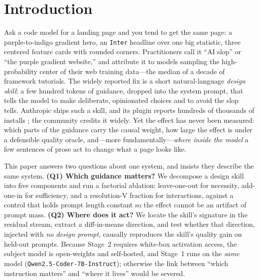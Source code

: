 \section{Introduction}
\label{sec:intro}

Ask a code model for a landing page and you tend to get the same page: a purple-to-indigo
gradient hero, an \texttt{Inter} headline over one big statistic, three centered feature
cards with rounded corners. Practitioners call it ``AI slop'' or ``the purple gradient
website,'' and attribute it to models sampling the high-probability center of their web
training data---the median of a decade of framework tutorials. The widely reported fix is a
short natural-language \emph{design skill}: a few hundred tokens of guidance, dropped into the
system prompt, that tells the model to make deliberate, opinionated choices and to avoid the
slop tells. Anthropic ships such a skill, and its plugin reports hundreds of thousands of
installs \citep{anthropic2025frontendskill,anthropic2025frontendblog}; the community credits
it widely. Yet the effect has never been measured: which parts of the guidance carry the
causal weight, how large the effect is under a defensible quality oracle, and---more
fundamentally---\emph{where inside the model} a few sentences of prose act to change what a
page looks like.

This paper answers two questions about one system, and insists they describe the same system.
\textbf{(Q1) Which guidance matters?} We decompose a design skill into five components and run
a factorial ablation: leave-one-out for necessity, add-one-in for sufficiency, and a
resolution-V fraction for interactions, against a control that holds prompt length constant so
the effect cannot be an artifact of prompt mass. \textbf{(Q2) Where does it act?} We locate the
skill's signature in the residual stream, extract a diff-in-means direction, and test whether
that direction, injected with \emph{no design prompt}, causally reproduces the skill's quality
gain on held-out prompts. Because Stage~2 requires white-box activation access, the subject
model is open-weights and self-hosted, and Stage~1 runs on the \emph{same} model
(\texttt{Qwen2.5-Coder-7B-Instruct}); otherwise the link between ``which instruction matters''
and ``where it lives'' would be severed.

